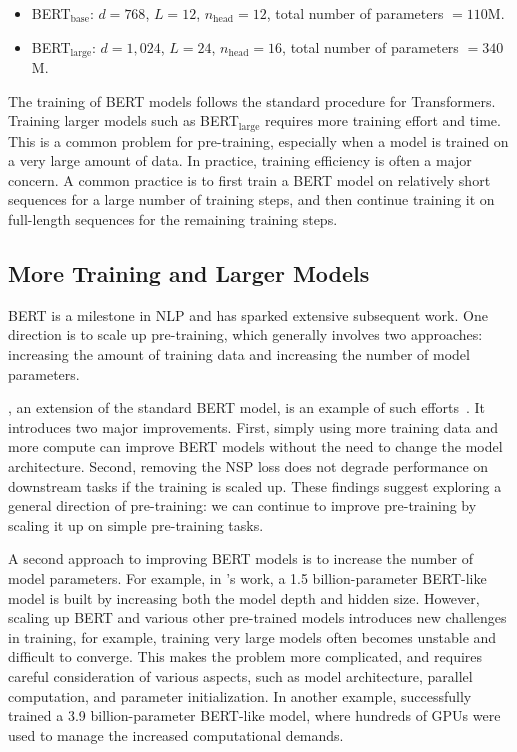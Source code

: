 \begin{itemize}
\item \vspace{0.5em} BERT$_{\mathrm{base}}$: $d=768$, $L=12$, $n_{\mathrm{head}}=12$, total number of parameters $=110$M.
\item \vspace{0.3em} BERT$_{\mathrm{large}}$: $d=1,024$, $L=24$, $n_{\mathrm{head}}=16$, total number of parameters $=340$M.
\end{itemize}
\vspace{0.3em}

The training of BERT models follows the standard procedure for Transformers. Training larger models such as BERT$_{\mathrm{large}}$ requires more training effort and time. This is a common problem for pre-training, especially when a model is trained on a very large amount of data. In practice, training efficiency is often a major concern. A common practice is to first train a BERT model on relatively short sequences for a large number of training steps, and then continue training it on full-length sequences for the remaining training steps.

\subsection{More Training and Larger Models}

\noindent BERT is a milestone in NLP and has sparked extensive subsequent work. One direction is to scale up pre-training, which generally involves two approaches: increasing the amount of training data and increasing the number of model parameters.

, an extension of the standard BERT model, is an example of such efforts~\cite{liu-etal:2019roberta}. It introduces two major improvements. First, simply using more training data and more compute can improve BERT models without the need to change the model architecture. Second, removing the NSP loss does not degrade performance on downstream tasks if the training is scaled up. These findings suggest exploring a general direction of pre-training: we can continue to improve pre-training by scaling it up on simple pre-training tasks.

A second approach to improving BERT models is to increase the number of model parameters. For example, in \citet{he-etal:2021deberta}'s work, a 1.5 billion-parameter BERT-like model is built by increasing both the model depth and hidden size. However, scaling up BERT and various other pre-trained models introduces new challenges in training, for example, training very large models often becomes unstable and difficult to converge. This makes the problem more complicated, and requires careful consideration of various aspects, such as model architecture, parallel computation, and parameter initialization. In another example, \citet{shoeybi-etal:2019megatron} successfully trained a 3.9 billion-parameter BERT-like model, where hundreds of GPUs were used to manage the increased computational demands.

